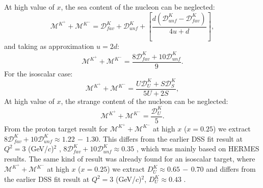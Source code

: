 At high value of $x$, the sea content of the nucleon can be neglected:
%
\begin{equation}
  \mathscr{M}^{K^+}+\mathscr{M}^{K^-} = \mathscr{D}^K_{fav}+\mathscr{D}^K_{unf}+\left[\frac{d\left( \mathscr{D}^K_{unf}-\mathscr{D}^K_{fav} \right)}{4u + d} \right],
\end{equation}
%
and taking as approximation $u=2d$:
%
\begin{equation}
  \mathscr{M}^{K^+}+\mathscr{M}^{K^-} = \frac{8\mathscr{D}^K_{fav}+10\mathscr{D}^K_{unf}}{9}.
\end{equation}
%
For the isoscalar case:
%
\begin{equation}\label{eq:ksum}
  \mathscr{M}^{K^+}+\mathscr{M}^{K^-} = \frac{U\mathscr{D}^K_U+S\mathscr{D}^K_S}{5U+2S},
\end{equation}
%
At high value of $x$, the strange content of the nucleon can be neglected:
%
\begin{equation}\label{eq:ksum}
  \mathscr{M}^{K^+}+\mathscr{M}^{K^-} = \frac{\mathscr{D}^K_U}{5}.
\end{equation}
%
From the proton target result for $\mathscr{M}^{K^+}+\mathscr{M}^{K^-}$ at high $x$ ($x = 0.25$) we extract $8\mathscr{D}^K_{fav}+10\mathscr{D}^K_{unf} \approx 1.22\,-\,1.30$. This differs from the earlier DSS fit result at $Q^2 = 3$ (GeV/$c$)$^2$ , $8\mathscr{D}^K_{fav}+10\mathscr{D}^K_{unf} \approx 0.35$ \cite{DSS07}, which was mainly based on HERMES results. The same kind of result was already found for an isoscalar target, where $\mathscr{M}^{K^+}+\mathscr{M}^{K^-}$ at high $x$ ($x = 0.25$) we extract $D_U^K \approx 0.65\,-\,0.70$ and differs from the earlier DSS fit result at $Q^2 = 3$ (GeV/$c$)$^2$, $D_U^K \approx 0.43$ \cite{DSS07}.

